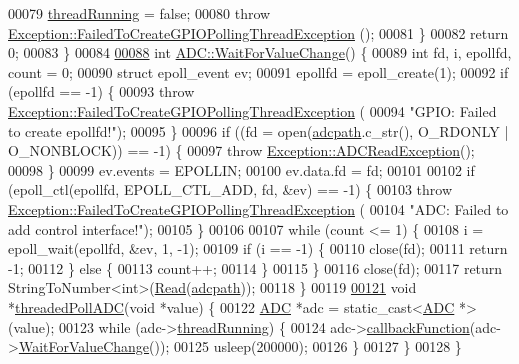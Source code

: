 \begin{DoxyCode}
00079     \hyperlink{class_hardware_1_1_b_b_b_a0d9d8c56afb37955e0d0c6baf0f418df}{threadRunning} = \textcolor{keyword}{false};
00080     \textcolor{keywordflow}{throw} \hyperlink{class_hardware_1_1_exception_1_1_failed_to_create_g_p_i_o_polling_thread_exception}{Exception::FailedToCreateGPIOPollingThreadException}
      ();
00081   \}
00082   \textcolor{keywordflow}{return} 0;
00083 \}
00084 
\hypertarget{_a_d_c_8cpp_source_l00088}{}\hyperlink{class_hardware_1_1_a_d_c_a7ae87fbf53ba93e33ea6eed41509a1f7}{00088} \textcolor{keywordtype}{int} \hyperlink{class_hardware_1_1_a_d_c_a7ae87fbf53ba93e33ea6eed41509a1f7}{ADC::WaitForValueChange}() \{
00089   \textcolor{keywordtype}{int} fd, i, epollfd, count = 0;
00090   \textcolor{keyword}{struct }epoll\_event ev;
00091   epollfd = epoll\_create(1);
00092   \textcolor{keywordflow}{if} (epollfd == -1) \{
00093     \textcolor{keywordflow}{throw} \hyperlink{class_hardware_1_1_exception_1_1_failed_to_create_g_p_i_o_polling_thread_exception}{Exception::FailedToCreateGPIOPollingThreadException}
      (
00094         \textcolor{stringliteral}{"GPIO: Failed to create epollfd!"});
00095   \}
00096   \textcolor{keywordflow}{if} ((fd = open(\hyperlink{class_hardware_1_1_a_d_c_a820ce4f097a70b95246049f9ea01df21}{adcpath}.c\_str(), O\_RDONLY | O\_NONBLOCK)) == -1) \{
00097     \textcolor{keywordflow}{throw} \hyperlink{class_hardware_1_1_exception_1_1_a_d_c_read_exception}{Exception::ADCReadException}();
00098   \}
00099   ev.events = EPOLLIN;
00100   ev.data.fd = fd;
00101 
00102   \textcolor{keywordflow}{if} (epoll\_ctl(epollfd, EPOLL\_CTL\_ADD, fd, &ev) == -1) \{
00103     \textcolor{keywordflow}{throw} \hyperlink{class_hardware_1_1_exception_1_1_failed_to_create_g_p_i_o_polling_thread_exception}{Exception::FailedToCreateGPIOPollingThreadException}
      (
00104         \textcolor{stringliteral}{"ADC: Failed to add control interface!"});
00105   \}
00106 
00107   \textcolor{keywordflow}{while} (count <= 1) \{
00108     i = epoll\_wait(epollfd, &ev, 1, -1);
00109     \textcolor{keywordflow}{if} (i == -1) \{
00110       close(fd);
00111       \textcolor{keywordflow}{return} -1;
00112     \} \textcolor{keywordflow}{else} \{
00113       count++;
00114     \}
00115   \}
00116   close(fd);
00117   \textcolor{keywordflow}{return} StringToNumber<int>(\hyperlink{class_hardware_1_1_b_b_b_a8b287ded7bcb2cfab361d1fca2b62e9f}{Read}(\hyperlink{class_hardware_1_1_a_d_c_a820ce4f097a70b95246049f9ea01df21}{adcpath}));
00118 \}
00119 
\hypertarget{_a_d_c_8cpp_source_l00121}{}\hyperlink{namespace_hardware_a594324488333eeaa49790a5391626fad}{00121} \textcolor{keywordtype}{void} *\hyperlink{namespace_hardware_a594324488333eeaa49790a5391626fad}{threadedPollADC}(\textcolor{keywordtype}{void} *value) \{
00122   \hyperlink{class_hardware_1_1_a_d_c}{ADC} *adc = \textcolor{keyword}{static\_cast<}\hyperlink{class_hardware_1_1_a_d_c}{ADC} *\textcolor{keyword}{>}(value);
00123   \textcolor{keywordflow}{while} (adc->\hyperlink{class_hardware_1_1_b_b_b_a0d9d8c56afb37955e0d0c6baf0f418df}{threadRunning}) \{
00124     adc->\hyperlink{class_hardware_1_1_b_b_b_a66d583952f3949a732ee15eea81e80e5}{callbackFunction}(adc->\hyperlink{class_hardware_1_1_a_d_c_a7ae87fbf53ba93e33ea6eed41509a1f7}{WaitForValueChange}());
00125     usleep(200000);
00126   \}
00127 \}
00128 \}
\end{DoxyCode}
